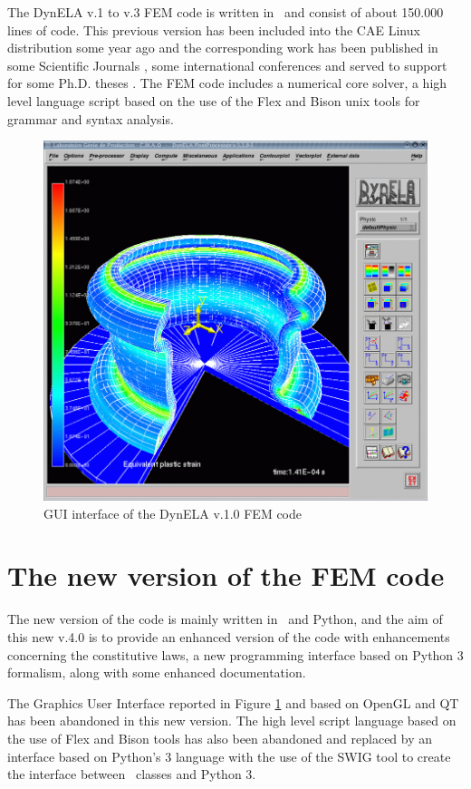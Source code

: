 The DynELA v.1 to v.3 FEM code is written in \Cpp~and consist of about 150.000 lines of code. This previous version has been included into the CAE Linux distribution some year ago and the corresponding work has been published in some Scientific Journals \cite{
pantale_object-oriented_2002,
pantale_development_2004,
pantale_parallelization_2005,
menanteau_methodology_2006,
nistor_numerical_2007,
nistor_numerical_2008,
pantale_rp_2020}
, some international conferences \cite{
menanteau_coupled_2005,
nistor_modeling_2005,
pantale_strategies_2005,
pantale_developpement_2004,
pantale_developpement_1999,
pantale_development_2002}
 and served to support for some Ph.D. theses \cite{
menanteau_developpement_2004,
nistor_identification_2005}
. The FEM code includes a numerical core solver, a high level language script based on the use of the Flex and Bison unix tools for grammar and syntax analysis.

\begin{figure}[h]
\begin{centering}
\includegraphics[width=0.5\columnwidth]{Figures/DynELA-v.1.1}
\par\end{centering}
\caption{GUI interface of the DynELA v.1.0 FEM code\label{fig:History!DynELAv1}}
\end{figure}

\section{The new version of the FEM code}
The new version of the code is mainly written in \Cpp~and Python, and the aim of this new v.4.0 is to provide an enhanced version of the code with enhancements concerning the constitutive laws, a new programming interface based on Python 3 formalism, along with some enhanced documentation.

The Graphics User Interface reported in Figure \ref{fig:History!DynELAv1} and based on OpenGL and QT has been abandoned in this new version. The high level script language based on the use of Flex and Bison tools has also been abandoned and replaced by an interface based on Python's 3 language with the use of the SWIG tool to create the interface between \Cpp~classes and Python 3.
